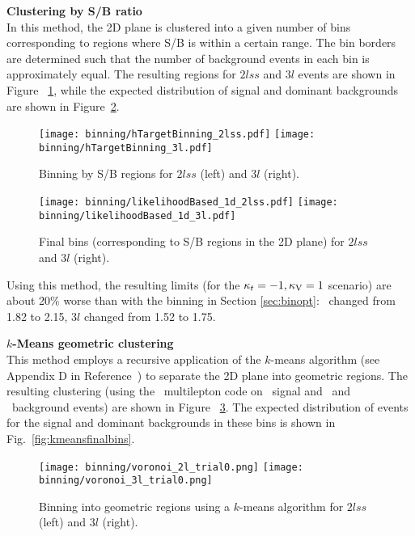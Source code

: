 \textbf{Clustering by S/B ratio}\\
In this method, the 2D plane is clustered into a given number of bins corresponding to regions where S/B is within a certain range. The bin borders are determined such that the number of background events in each bin is approximately equal. The resulting regions for $2lss$ and $3l$  events are shown in Figure ~\ref{fig:sbbinning}, while the expected distribution of signal and dominant backgrounds are shown in Figure~\ref{fig:sbfinalbins}.

\begin{figure} [!h]
  \centering
  \texttt{[image: binning/hTargetBinning\_2lss.pdf]}
  \texttt{[image: binning/hTargetBinning\_3l.pdf]}
  \caption{Binning by S/B regions for $2lss$ (left) and $3l$ (right).}
  \label{fig:sbbinning}
\end{figure}

\begin{figure} [!h]
  \centering
  \texttt{[image: binning/likelihoodBased\_1d\_2lss.pdf]}
  \texttt{[image: binning/likelihoodBased\_1d\_3l.pdf]}
  \caption[Final bins (corresponding to S/B regions in the 2D plane)]{Final bins (corresponding to S/B regions in the 2D plane) for $2lss$ and $3l$ (right).}
  \label{fig:sbfinalbins}
\end{figure}

Using this method, the resulting limits (for the $\kappa_t=-1, \kappa_\text{V}=1$ scenario) are about 20\% worse than with the binning in Section \ref{sec:binopt}: \mumu\ changed from 1.82 to 2.15, $3l$ changed from 1.52 to 1.75.

\textbf{$k$-Means geometric clustering}\\
This method employs a recursive application of the $k$-means algorithm (see Appendix D in Reference~\cite{CMS_AN_2017-029}) to separate the 2D plane into geometric regions. The resulting clustering (using the \ttH\ multilepton code on \tHq\ signal and \ttbar\ and \ttV\ background events) are shown in Figure ~\ref{fig:kmeansbinning}. The expected distribution of events for the signal and dominant backgrounds in these bins is shown in Fig.~\ref{fig:kmeansfinalbins}.
\begin{figure} [!h]
  \centering
  \texttt{[image: binning/voronoi\_2l\_trial0.png]}
  \texttt{[image: binning/voronoi\_3l\_trial0.png]}
  \caption[Binning into geometric regions using a $k$-means algorithm.]{Binning into geometric regions using a $k$-means algorithm for $2lss$ (left) and $3l$ (right).}
  \label{fig:kmeansbinning}
\end{figure}

